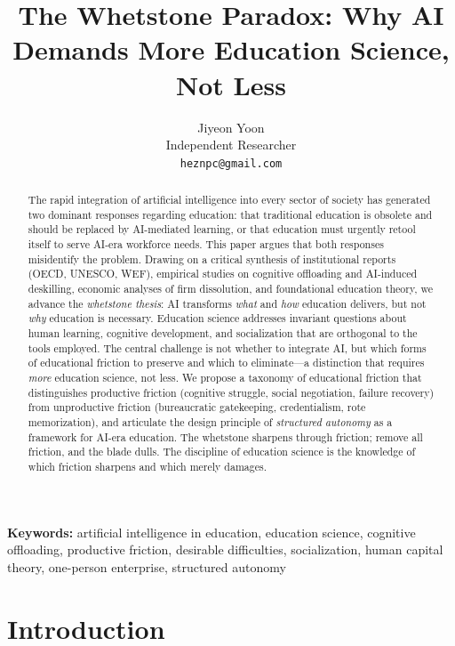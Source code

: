 \documentclass[12pt]{article}
\title{The Whetstone Paradox: Why AI Demands More Education Science, Not Less}
\author{Jiyeon Yoon\\
Independent Researcher\\
\texttt{heznpc@gmail.com}}
\date{}
\begin{document}
\maketitle

\begin{abstract}
The rapid integration of artificial intelligence into every sector of society has generated two dominant responses regarding education: that traditional education is obsolete and should be replaced by AI-mediated learning, or that education must urgently retool itself to serve AI-era workforce needs. This paper argues that both responses misidentify the problem. Drawing on a critical synthesis of institutional reports (OECD, UNESCO, WEF), empirical studies on cognitive offloading and AI-induced deskilling, economic analyses of firm dissolution, and foundational education theory, we advance the \emph{whetstone thesis}: AI transforms \emph{what} and \emph{how} education delivers, but not \emph{why} education is necessary. Education science addresses invariant questions about human learning, cognitive development, and socialization that are orthogonal to the tools employed. The central challenge is not whether to integrate AI, but which forms of educational friction to preserve and which to eliminate---a distinction that requires \emph{more} education science, not less. We propose a taxonomy of educational friction that distinguishes productive friction (cognitive struggle, social negotiation, failure recovery) from unproductive friction (bureaucratic gatekeeping, credentialism, rote memorization), and articulate the design principle of \emph{structured autonomy} as a framework for AI-era education. The whetstone sharpens through friction; remove all friction, and the blade dulls. The discipline of education science is the knowledge of which friction sharpens and which merely damages.
\end{abstract}

\textbf{Keywords:} artificial intelligence in education, education science, cognitive offloading, productive friction, desirable difficulties, socialization, human capital theory, one-person enterprise, structured autonomy

\section{Introduction}
\label{sec:introduction}
\end{document}
